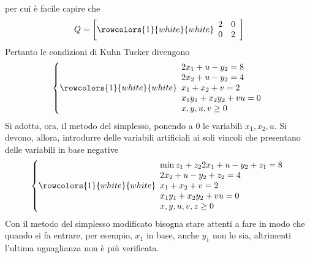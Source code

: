 \documentclass[a4paper]{extarticle}
\begin{document}
per cui è facile capire che
\[Q=\left[
    \rowcolors{1}{white}{white}
    \begin{array}{cc}
        2 & 0\\
        0 & 2\\
    \end{array}
\right]\]
Pertanto le condizioni di Kuhn Tucker divengono
\[
    \left\{
    \rowcolors{1}{white}{white}
    \begin{array}{l}
        2x_1 + u - y_2 = 8\\
        2x_2 + u - y_2 = 4\\
        x_1+x_2+v=2\\
        x_1 y_1 + x_2 y_2 + v u = 0\\
        x,y,u,v \geq 0\\
    \end{array}
    \right.
\]
Si adotta, ora, il metodo del simplesso, ponendo a $0$ le variabili $x_1,x_2,u$. Si devono, allora, introdurre delle variabili artificiali ai soli vincoli che presentano delle variabili in base negative
\[
    \left\{
    \rowcolors{1}{white}{white}
    \begin{array}{l}
        \min z_1+z_2
        2x_1 + u - y_2 + z_1 = 8\\
        2x_2 + u - y_2 + z_2 = 4\\
        x_1+x_2+v=2\\
        x_1 y_1 + x_2 y_2 + v u = 0\\
        x,y,u,v,z \geq 0\\
    \end{array}
    \right.
\]
Con il metodo del simplesso modificato bisogna stare attenti a fare in modo che quando si fa entrare, per esempio, $x_1$ in base, anche $y_1$ non lo sia, altrimenti l'ultima uguaglianza non è più verificata.
\end{document}

